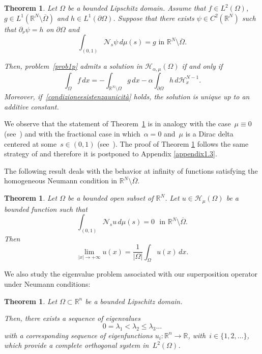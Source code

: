 \documentclass[12pt,a4paper,intlimits,sumlimits]{amsart}
\def \R {\mathbb{R}}
\def \Ns {\mathscr{N}_{s}}
\theoremstyle{definition}
\theoremstyle{plain}
\newtheorem{theorem}[definition]{Theorem}
\numberwithin{equation}{section}
\renewcommand{\le}{\leqslant}
\begin{document}
\begin{theorem}\label{uptoconstant}
Let $\Omega$ be a bounded Lipschitz domain. Assume that
$f\in L^2(\Omega)$, $g\in L^1(\R^N\setminus\overline\Omega)$ and $h\in L^1(\partial\Omega)$. Suppose that there exists $\psi \in C^2(\R^N)$ such that $\partial_\nu \psi =h$ on $\partial \Omega$ and
\[
\int_{(0, 1)}\Ns \psi \,d\mu(s)=g \mbox{ in } \R^N\setminus\overline{\Omega}.
\]

Then, problem~\eqref{prob1p} admits a solution in 
$\mathcal{H}_{\alpha,\mu}(\Omega)$ if and only if 
\begin{equation}\label{condizioneesistenzaunicità}
\int_\Omega f\,dx =-\int_{\R^N\setminus\Omega} g\,dx
-\alpha \int_{\partial\Omega}h\,d\mathscr{H}_x^{N-1}.
\end{equation}
Moreover, if~\eqref{condizioneesistenzaunicità} holds,
the solution is unique up to an additive constant.
\end{theorem}

We observe that the statement of Theorem~\ref{uptoconstant} is in analogy with the case~$\mu\equiv 0$ (see~\cite[page~294]{MR3012036}) and with the fractional case in which~$\alpha=0$ and~$\mu$ is a Dirac delta centered at some~$s\in(0,1)$ (see~\cite[Theorem 3.9]{MR3651008}). The proof of Theorem \ref{uptoconstant} follows the same strategy of \cite[Theorem 3.9]{MR3651008} and therefore it is postponed to Appendix \ref{appendix1.3}.

The following result deals with the behavior at infinity of 
functions satisfying the homogeneous Neumann condition
in $\R^N\setminus \overline{\Omega}$.

\begin{theorem}\label{ASYM}
Let $\Omega$ be a bounded open subset of $\R^N$.
Let $u\in \mathcal{H}_\mu(\Omega)$ be a bounded function such that
\[
\int_{(0,1)} \Ns u\,d\mu(s)=0 \,\,
\mbox{ in } \R^N \setminus \overline{\Omega}.
\]
Then
\[
\lim_{|x|\to +\infty}u(x)
=\frac{1}{|\Omega|}\int_\Omega u(x)\,dx.
\]
\end{theorem}

We also study the eigenvalue problem associated with our superposition operator under Neumann conditions:

\begin{theorem}\label{ETGBAVA}
Let $\Omega\subset\R^n$ be a bounded Lipschitz domain. 

Then, there exists a sequence of eigenvalues
\[
0=\lambda_1<\lambda_2\le\lambda_3\dots
\]
with a corresponding sequence of eigenfunctions $u_i:\R^n\to\R$,
with~$i\in\{1,2,\dots\}$, which provide a complete orthogonal system in~$L^2(\Omega)$.
\end{theorem}
\end{document}

